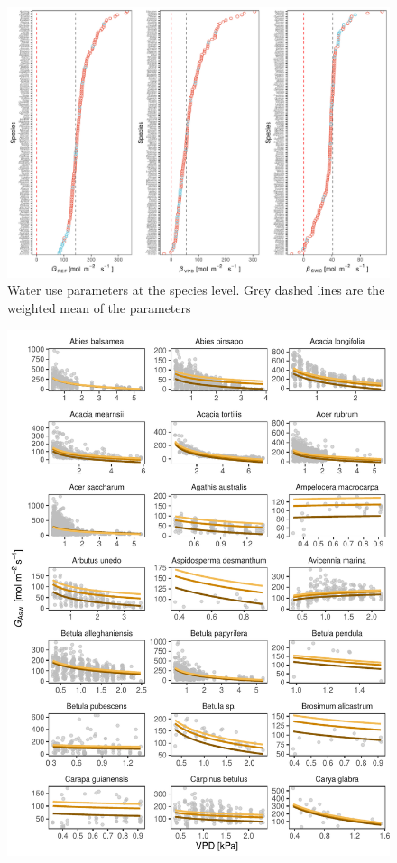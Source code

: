 \documentclass[11pt,twoside]{reedthesis}
\begin{document}
\begin{landscape}
\begin{figure}[H]

{\centering \includegraphics[width=0.9\linewidth]{figure/appendixD/fig17} 

}

\caption{Water use parameters at the species level. Grey dashed lines are the weighted mean of the parameters}\label{fig:spparamplot}
\end{figure}

\end{landscape}
\begin{figure}[H]

{\centering \includegraphics[width=1\linewidth]{figure/appendixD/ggg1} 

}

\end{figure}
\end{document}
